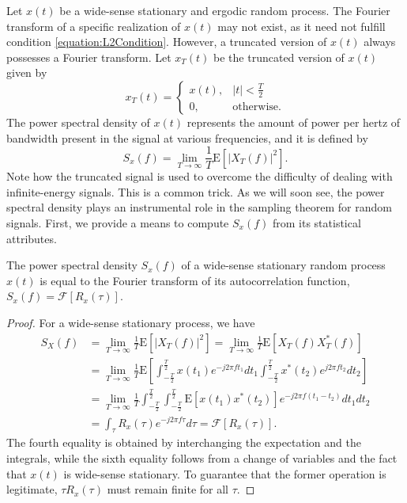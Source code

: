 Let $x(t)$ be a wide-sense stationary and ergodic random process.
The Fourier transform of a specific realization of $x(t)$ may not exist, as it need not fulfill condition \eqref{equation:L2Condition}.
However, a truncated version of $x(t)$ always possesses a Fourier transform.
Let $x_T(t)$ be the truncated version of $x(t)$ given by
\begin{equation*}
x_T(t) = \begin{cases} x(t), & |t| < \frac{T}{2} \\
0, & \text{otherwise} . \end{cases}
\end{equation*}
The power spectral density of $x(t)$ represents the amount of power per hertz of bandwidth present in the signal at various frequencies, and it is defined by
\begin{equation*}
S_x(f) = \lim_{T \rightarrow \infty} \frac{1}{T} \mathrm{E} \left[ |X_T(f)|^2 \right] .
\end{equation*}
Note how the truncated signal is used to overcome the difficulty of dealing with infinite-energy signals.
This is a common trick.
As we will soon see, the power spectral density plays an instrumental role in the sampling theorem for random signals.
First, we provide a means to compute $S_x(f)$ from its statistical attributes.

\begin{theorem}
The power spectral density $S_x (f)$ of a wide-sense stationary random process $x(t)$ is equal to the Fourier transform of its autocorrelation function, $S_x (f) = \mathcal{F} [R_x (\tau)]$.
\end{theorem}
\begin{proof}
For a wide-sense stationary process, we have
\begin{equation*}
\begin{split}
S_X(f) &= \lim_{T \rightarrow \infty} \frac{1}{T} \mathrm{E} \left[ |X_T(f)|^2 \right]
= \lim_{T \rightarrow \infty} \frac{1}{T} \mathrm{E} \left[ X_T(f) X_T^*(f) \right] \\
&= \lim_{T \rightarrow \infty} \frac{1}{T} \mathrm{E} \left[
\int_{-\frac{T}{2}}^{\frac{T}{2}} x(t_1) e^{-j2 \pi f t_1} dt_1
\int_{-\frac{T}{2}}^{\frac{T}{2}} x^*(t_2) e^{j2 \pi f t_2} dt_2 \right] \\
&= \lim_{T \rightarrow \infty} \frac{1}{T}
\int_{-\frac{T}{2}}^{\frac{T}{2}} \int_{-\frac{T}{2}}^{\frac{T}{2}}
\mathrm{E} \left[ x(t_1) x^*(t_2) \right]
e^{-j2 \pi f (t_1-t_2)} dt_1 dt_2 \\
&= \int_{\tau} R_x (\tau) e^{-j2 \pi f\tau} d\tau
= \mathcal{F} [ R_x (\tau) ] .
\end{split}
\end{equation*}
The fourth equality is obtained by interchanging the expectation and the integrals, while the sixth equality follows from a change of variables and the fact that $x(t)$ is wide-sense stationary.
To guarantee that the former operation is legitimate, $\tau R_x(\tau)$ must remain finite for all $\tau$.
\end{proof}


